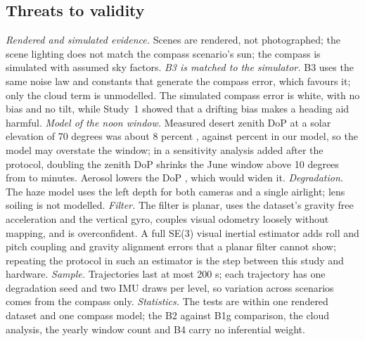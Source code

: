 \documentclass[conference]{IEEEtran}
\begin{document}
\subsection*{Threats to validity}
\emph{Rendered and simulated evidence.} Scenes are rendered, not photographed; the scene lighting does not match the compass scenario's sun; the compass is simulated with assumed sky factors. \emph{B3 is matched to the simulator.} B3 uses the same noise law and constants that generate the compass error, which favours it; only the cloud term is unmodelled. The simulated compass error is white, with no bias and no tilt, while Study~1 showed that a drifting bias makes a heading aid harmful. \emph{Model of the noon window.} Measured desert zenith DoP at a solar elevation of 70 degrees was about 8 percent \cite{horvath}, against \ndopSeventy{} percent in our model, so the model may overstate the window; in a sensitivity analysis added after the protocol, doubling the zenith DoP shrinks the June window above 10 degrees from \njuneTen{} to \njuneTenDouble{} minutes. Aerosol lowers the DoP \cite{pust}, which would widen it. \emph{Degradation.} The haze model uses the left depth for both cameras and a single airlight; lens soiling is not modelled. \emph{Filter.} The filter is planar, uses the dataset's gravity free acceleration and the vertical gyro, couples visual odometry loosely without mapping, and is overconfident. A full SE(3) visual inertial estimator adds roll and pitch coupling and gravity alignment errors that a planar filter cannot show; repeating the protocol in such an estimator \cite{openvins} is the step between this study and hardware. \emph{Sample.} Trajectories last at most 200 s; each trajectory has one degradation seed and two IMU draws per level, so variation across scenarios comes from the compass only. \emph{Statistics.} The tests are within one rendered dataset and one compass model; the B2 against B1g comparison, the cloud analysis, the yearly window count and B4 carry no inferential weight.
\end{document}
